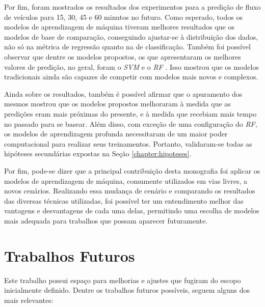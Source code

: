 Por fim, foram mostrados os resultados dos experimentos para a predição de fluxo de veículos para 15, 30, 45 e 60 minutos no futuro. Como esperado, todos os modelos de aprendizagem de máquina tiveram melhores resultados que os modelos de base de comparação, conseguindo ajustar-se à distribuição dos dados, não só na métrica de regressão quanto na de classificação. Também foi possível observar que dentre os modelos propostos, os que apresentaram os melhores valores de predição, no geral, foram o \textit{\acrshort{SVM}} e o \textit{\acrshort{RF}} . Isso mostrou que os modelos tradicionais ainda são capazes de competir com modelos mais novos e complexos. 

Ainda sobre os resultados, também é possível afirmar que o apuramento dos mesmos mostrou que os modelos propostos melhoraram à medida que as predições eram mais próximas do presente, e à medida que recebiam mais tempo no passado para se basear. Além disso, com exceção de uma configuração do \textit{\acrshort{RF}}, os modelos de aprendizagem profunda necessitaram de um maior poder computacional para realizar seus treinamentos. Portanto, validaram-se todas as hipóteses secundárias expostas na Seção \ref{chapter:hipoteses}.

Por fim, pode-se dizer que a principal contribuição desta monografia foi aplicar os modelos de aprendizagem de máquina, comumente utilizados em vias livres, a novos cenários. Realizando essa mudança de cenário e comparando os resultados das diversas técnicas utilizadas, foi possível ter um entendimento melhor das vantagens e desvantagens de cada uma delas, permitindo uma escolha de modelos mais adequada para trabalhos que possam aparecer futuramente.

\section{Trabalhos Futuros}

Este trabalho possui espaço para melhorias e ajustes que fugiram do escopo inicialmente definido. Dentre os trabalhos futuros possíveis, seguem alguns dos mais relevantes:

